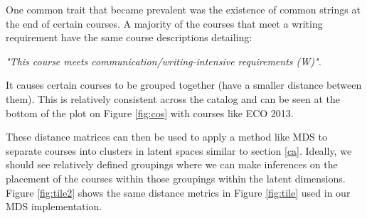 One common trait that became prevalent was the existence of common strings at the end of certain courses.  A majority of the courses that meet a writing 
requirement have the same course descriptions detailing:

 \textit{"This course meets communication/writing-intensive requirements (W)".} 
 
It causes certain courses to be grouped together (have a smaller distance between them).  This is relatively consistent across the catalog and can 
be seen at the bottom of the plot on Figure \ref{fig:cos} with courses like ECO 2013. 

These distance matrices can then be used to apply a method like MDS to separate courses into clusters in latent spaces similar to section \ref{ca}. Ideally, 
we should see relatively defined groupings where we can make inferences on the placement of the courses within those groupings within the latent dimensions.  
Figure \ref{fig:tile2} shows the same distance metrics in Figure \ref{fig:tile} used in our MDS implementation.

